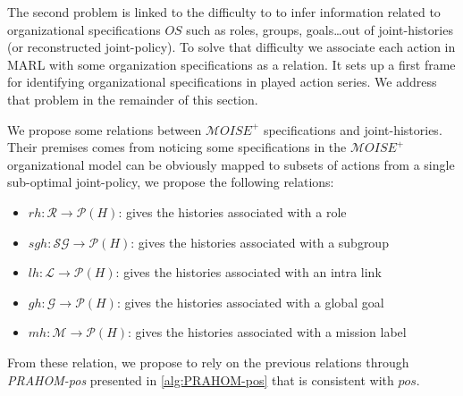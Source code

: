 \documentclass{ecai}
\newcounter{relation}
\begin{document}
The second problem is linked to the difficulty to to infer information related to organizational specifications $OS$ such as roles, groups, goals\dots out of joint-histories (or reconstructed joint-policy).
To solve that difficulty we associate each action in MARL with some organization specifications as a  relation. It sets up a first frame for identifying organizational specifications in played action series. We address that problem in the remainder of this section.

We propose some relations between $\mathcal{M}OISE^+$ specifications and joint-histories. Their premises comes from noticing some specifications in the $\mathcal{M}OISE^+$ organizational model can be obviously mapped to subsets of actions from a single sub-optimal joint-policy, we propose the following relations:

\begin{itemize}
    \item $rh: \mathcal{R} \rightarrow \mathcal{P}(H)$: gives the histories associated with a role
    \item $sgh: \mathcal{SG} \rightarrow \mathcal{P}(H)$: gives the histories associated with a subgroup
    \item $lh: \mathcal{L} \rightarrow \mathcal{P}(H)$: gives the histories associated with an intra link
    \item $gh: \mathcal{G} \rightarrow \mathcal{P}(H)$: gives the histories associated with a global goal
    \item $mh: \mathcal{M} \rightarrow \mathcal{P}(H)$: gives the histories associated with a mission label
\end{itemize}

From these relation, we propose to rely on the previous relations through \emph{PRAHOM-pos} presented in \autoref{alg:PRAHOM-pos} that is consistent with $pos$.

\end{document}
